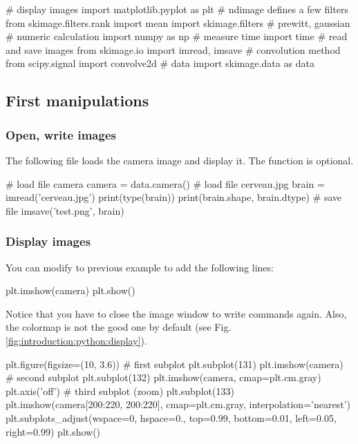 \def\QRCODE{TB_image_TUT.IMG.introduction_pythonqrcode.png}
\def\QRPAGE{http://www.iptutorials.science/tree/master/TB_image/TUT.IMG.introduction/python}

\begin{python}
# display images
import matplotlib.pyplot as plt
# ndimage defines a few filters
from skimage.filters.rank import mean
import skimage.filters  # prewitt, gaussian
# numeric calculation
import numpy as np
# measure time
import time
# read and save images
from skimage.io import imread, imsave
# convolution method
from scipy.signal import convolve2d
# data
import skimage.data as data
\end{python}

\vspace*{-10pt}
\subsection{First manipulations}

\subsubsection{Open, write images}
The following file loads the camera image and display it. The  function is optional.


\begin{python}
# load file camera
camera = data.camera()
# load file cerveau.jpg
brain = imread('cerveau.jpg')
print(type(brain))
print(brain.shape, brain.dtype)
# save file
imsave('test.png', brain)
\end{python}


\subsubsection{Display images}
You can modify to previous example to add the following lines:
\begin{python}
plt.imshow(camera)
plt.show()
\end{python}
Notice that you have to close the image window to write commands again. Also, the colormap is not the good one by default (see Fig. \ref{fig:introduction:python:display}).

\begin{python}
plt.figure(figsize=(10, 3.6))
# first subplot
plt.subplot(131)
plt.imshow(camera)
# second subplot
plt.subplot(132)
plt.imshow(camera, cmap=plt.cm.gray)
plt.axis('off')
# third subplot (zoom)
plt.subplot(133)
plt.imshow(camera[200:220, 200:220], cmap=plt.cm.gray, interpolation='nearest')
plt.subplots_adjust(wspace=0, hspace=0., 
                    top=0.99, bottom=0.01, 
                    left=0.05, right=0.99)
plt.show()
\end{python}


